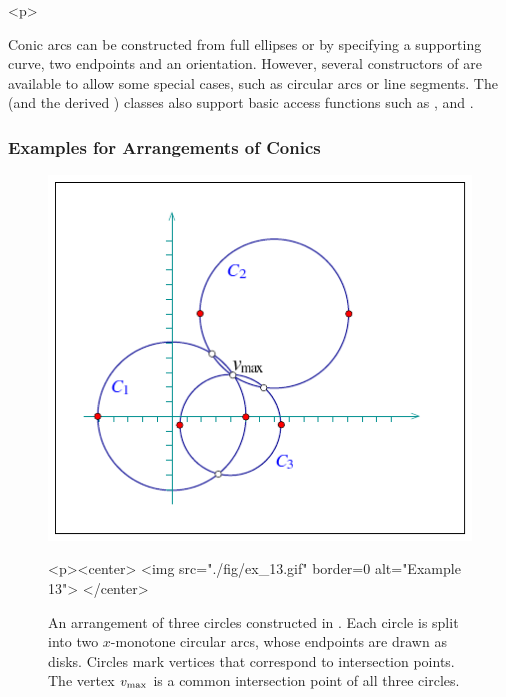 \begin{ccHtmlOnly}<p>\end{ccHtmlOnly}
Conic arcs can be constructed from full ellipses or by specifying
a supporting curve, two endpoints and an orientation. However,
several constructors of  are available to allow some
special cases, such as circular arcs or line segments. The
 (and the derived ) classes
also support basic access functions such as ,
 and .

\subsubsection{Examples for Arrangements of Conics}
%
\begin{figure}[!htp]
\begin{ccTexOnly}
  \begin{center}
  \includegraphics{Arrangement_2/fig/ex_13}
  \end{center}
\end{ccTexOnly}
\begin{ccHtmlOnly}
  <p><center>
  <img src="./fig/ex_13.gif" border=0 alt="Example 13">
  </center>
\end{ccHtmlOnly}
\caption{An arrangement of three circles constructed in
. Each circle is split into two $x$-monotone
circular arcs, whose endpoints are drawn as disks. Circles
mark vertices that correspond to intersection points. The vertex
$v_{\rm max}$ is a common intersection point of all three
circles.}
\label{arr_fig:ex_13}
\end{figure}

